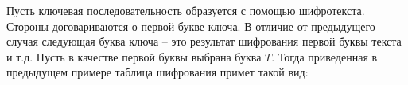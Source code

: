\example
Пусть ключевая последовательность образуется с помощью шифротекста. Стороны договариваются о первой букве ключа. В отличие от предыдущего случая следующая буква ключа -- это результат
шифрования первой буквы текста и т.д. Пусть в качестве первой буквы выбрана буква  $T$. Тогда приведенная в предыдущем примере таблица шифрования примет такой вид:
\begin{center}  \end{center}
\exampleend
